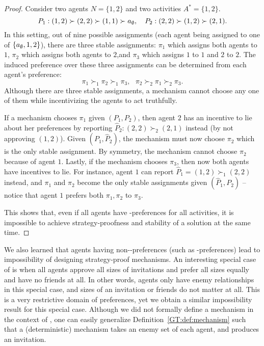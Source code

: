 \begin{proof} %
Consider two agents $N = \{1, 2\}$ and two activities $A^* = \{1, 2\}$.
	\begin{equation*}
		P_1: (1, 2) \succ (2, 2) \succ (1, 1) \succ a_{\emptyset}, ~~~
		P_2: (2, 2) \succ (1, 2) \succ (2, 1).
	\end{equation*}
In this setting, out of nine possible assignments (each agent being assigned to one of $\{a_{\emptyset}, 1, 2\}$), there are three stable assignments: $\pi_1$ which assigns both agents to $1$, $\pi_2$ which assigns both agents to $2$,and $\pi_3$ which assigns $1$ to $1$ and $2$ to $2$.
The induced preference over these three assignments can be determined from each agent's preference: 
	\begin{equation*}
		\pi_1 \succ_1 \pi_2 \succ_1 \pi_3, ~~~
		\pi_2 \succ_2 \pi_1 \succ_2 \pi_3.
	\end{equation*} 
Although there are three stable assignments, a mechanism cannot choose any one of them while incentivizing the agents to act truthfully.

If a mechanism chooses $\pi_1$ given $(P_1, P_2)$, then agent $2$ has an incentive to lie about her preferences by reporting $\hat{P}_2: (2, 2) \succ_2 (2, 1)$ instead (by not approving $(1, 2)$). Given $(P_1, \hat{P}_2)$, the mechanism must now choose $\pi_2$ which is the only stable assignment. 
By symmetry, the mechanism cannot choose $\pi_2$ because of agent $1$.
Lastly, if the mechanism chooses $\pi_3$, then now both agents have incentives to lie. For instance, agent $1$ can report $\hat{P}_1 = (1, 2) \succ_1 (2, 2)$ instead, and $\pi_1$ and $\pi_2$ become the only stable assignments given $(\hat{P}_1, P_2)$ -- notice that agent $1$ prefers both $\pi_1, \pi_2$ to $\pi_3$. 

This shows that, even if all agents have \INC-preferences for all activities, it is impossible to achieve strategy-proofness and stability of a solution at the same time.
\end{proof}


We also learned that agents having non-\INC-preferences (such as \DEC-preferences) lead to impossibility of designing strategy-proof mechanisms. An interesting special case of \SIPs is when all agents approve all sizes of invitations and prefer all sizes equally and have no friends at all. In other words, agents only have enemy relationships in this special case, and sizes of an invitation or friends do not matter at all. This is a very restrictive domain of preferences, yet we obtain a similar impossibility result for this special case. Although we did not formally define a mechanism in the context of \SIP, one can easily generalize Definition~\ref{GT:def:mechanism} such that a (deterministic) mechanism takes an enemy set of each agent, and produces an invitation.

